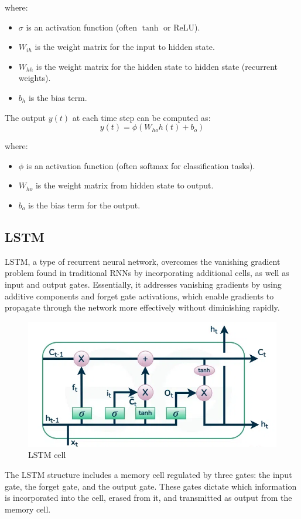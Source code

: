 \documentclass{ieeeojies}
\begin{document}
where:
\begin{itemize}
    \item \( \sigma \) is an activation function (often \(\tanh\) or \(\mathrm{ReLU}\)).
    \item \( W_{ih} \) is the weight matrix for the input to hidden state.
    \item \( W_{hh} \) is the weight matrix for the hidden state to hidden state (recurrent weights).
    \item \( b_h \) is the bias term.
\end{itemize}

The output \( y(t) \) at each time step can be computed as:
\begin{equation}
y(t) = \phi \left( W_{ho} h(t) + b_o \right)
\end{equation}

where:
\begin{itemize}
    \item \( \phi \) is an activation function (often softmax for classification tasks).
    \item \( W_{ho} \) is the weight matrix from hidden state to output.
    \item \( b_o \) is the bias term for the output.
\end{itemize}

\subsection{LSTM}
LSTM, a type of recurrent neural network, overcomes the vanishing gradient problem found in traditional RNNs by incorporating additional cells, as well as input and output gates. Essentially, it addresses vanishing gradients by using additive components and forget gate activations, which enable gradients to propagate through the network more effectively without diminishing rapidly.
\begin{figure}[H]
  \centering
  \begin{minipage}{0.8\linewidth}
    \centering
    \includegraphics[width=\linewidth]{LSTM Plot/lstm.png}
    \caption{LSTM cell \cite{b12}}
    \label{fig2}
  \end{minipage}
\end{figure}
The LSTM structure includes a memory cell regulated by three gates: the input gate, the forget gate, and the output gate. These gates dictate which information is incorporated into the cell, erased from it, and transmitted as output from the memory cell.\cite{b12}
\end{document}
